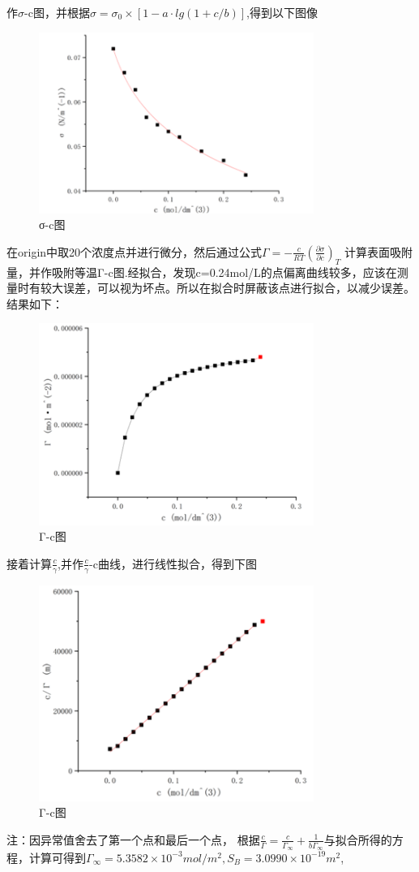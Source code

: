 \documentclass[hyperref,a4paper,UTF8]{ctexart}
\begin{document}
作$\sigma$-c图，并根据$\sigma={\sigma _{0}} \times [1-a\cdot lg(1+c/b)]$,得到以下图像
\begin{figure}[H]
    \centering
    \includegraphics[width=0.8\textwidth,height=0.5\textwidth]{4.png}
    \caption{σ-c图}
    \label{fig:my_label}
\end{figure}
在origin中取20个浓度点并进行微分，然后通过公式$\Gamma =-\frac{c}{RT} (\frac{\partial \sigma }{\partial c})_{T}$ 计算表面吸附量，并作吸附等温Γ-c图.经拟合，发现c=0.24mol/L的点偏离曲线较多，应该在测量时有较大误差，可以视为坏点。所以在拟合时屏蔽该点进行拟合，以减少误差。结果如下：
\begin{figure}[H]
    \centering
    \includegraphics[width=0.8\textwidth,height=0.5\textwidth]{5.png}
    \caption{Γ-c图}
    \label{fig:my_label}
\end{figure}
接着计算$\frac{c}{\gamma}$,并作$\frac{c}{\gamma}$-c曲线，进行线性拟合，得到下图
\begin{figure}[H]
    \centering
    \includegraphics[width=0.8\textwidth,height=0.5\textwidth]{6.png}
    \caption{Γ-c图}
    \label{fig:my_label}
\end{figure}
注：因异常值舍去了第一个点和最后一个点，
根据$\frac{c}{\Gamma}=\frac{c}{\Gamma _{\infty}}  +\frac{1}{b\Gamma _{\infty}}$与拟合所得的方程，计算可得到$\Gamma _{\infty}={5.3582} \times {10^{-3}}mol/m^{2},S_{B}=3.0990 \times 10^{-19}m^{2}$,
\end{document}
